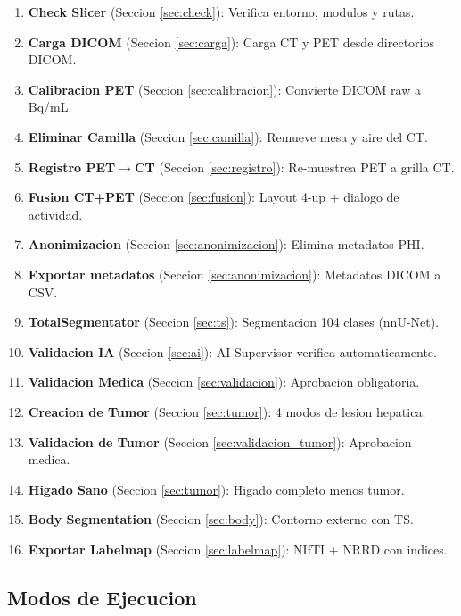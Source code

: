 \documentclass[12pt,a4paper]{article}
\begin{document}
\begin{enumerate}
    \item \textbf{Check Slicer} (Seccion \ref{sec:check}): Verifica entorno, modulos y rutas.
    \item \textbf{Carga DICOM} (Seccion \ref{sec:carga}): Carga CT y PET desde directorios DICOM.
    \item \textbf{Calibracion PET} (Seccion \ref{sec:calibracion}): Convierte DICOM raw a Bq/mL.
    \item \textbf{Eliminar Camilla} (Seccion \ref{sec:camilla}): Remueve mesa y aire del CT.
    \item \textbf{Registro PET$\to$CT} (Seccion \ref{sec:registro}): Re-muestrea PET a grilla CT.
    \item \textbf{Fusion CT+PET} (Seccion \ref{sec:fusion}): Layout 4-up + dialogo de actividad.
    \item \textbf{Anonimizacion} (Seccion \ref{sec:anonimizacion}): Elimina metadatos PHI.
    \item \textbf{Exportar metadatos} (Seccion \ref{sec:anonimizacion}): Metadatos DICOM a CSV.
    \item \textbf{TotalSegmentator} (Seccion \ref{sec:ts}): Segmentacion 104 clases (nnU-Net).
    \item \textbf{Validacion IA} (Seccion \ref{sec:ai}): AI Supervisor verifica automaticamente.
    \item \textbf{Validacion Medica} (Seccion \ref{sec:validacion}): Aprobacion obligatoria.
    \item \textbf{Creacion de Tumor} (Seccion \ref{sec:tumor}): 4 modos de lesion hepatica.
    \item \textbf{Validacion de Tumor} (Seccion \ref{sec:validacion_tumor}): Aprobacion medica.
    \item \textbf{Higado Sano} (Seccion \ref{sec:tumor}): Higado completo menos tumor.
    \item \textbf{Body Segmentation} (Seccion \ref{sec:body}): Contorno externo con TS.
    \item \textbf{Exportar Labelmap} (Seccion \ref{sec:labelmap}): NIfTI + NRRD con indices.
\end{enumerate}

\subsection{Modos de Ejecucion}
\end{document}
